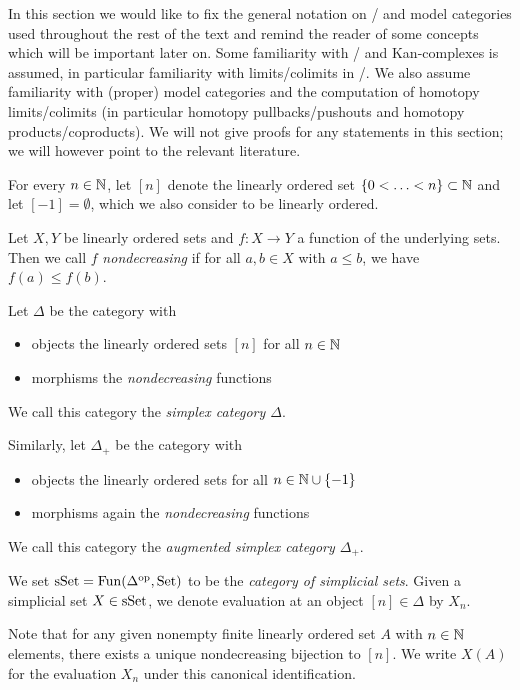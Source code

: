 In this section we would like to fix the general notation on \inftycats/ and model categories used throughout the rest of the text and remind the reader of some concepts which will be important later on.
Some familiarity with \inftycats/ and Kan-complexes is assumed, in particular familiarity with limits/colimits in \inftycats/.
We also assume familiarity with (proper) model categories and the computation of homotopy limits/colimits (in particular homotopy pullbacks/pushouts and homotopy products/coproducts).
We will not give proofs for any statements in this section; we will however point to the relevant literature.
\begin{definition}
    For every $n\in\mathbb{N}$, let $[n]$ denote the linearly ordered set $\left\lbrace0<\ldots<n\right\rbrace\subset\mathbb{N}$ and let $[-1]=\emptyset$, which we also consider to be linearly ordered.
\end{definition}
\begin{definition}
    Let $X,Y$ be linearly ordered sets and $f\colon X\to Y$ a function of the underlying sets.
    Then we call $f$ \emph{nondecreasing} if for all $a,b\in X$ with $a\leq b$, we have $f(a)\leq f(b)$.
\end{definition}
\begin{definition}
    Let $\Delta$ be the category with
    \begin{itemize}
        \item objects the linearly ordered sets $[n]$ for all $n\in\mathbb{N}$
        \item morphisms the \emph{nondecreasing} functions
    \end{itemize}
    We call this category the \emph{simplex category $\Delta$}.

    Similarly, let $\Delta_+$ be the category with
    \begin{itemize}
        \item objects the linearly ordered sets for all $n\in\mathbb{N}\cup\left\lbrace-1\right\rbrace$ 
        \item morphisms again the \emph{nondecreasing} functions
    \end{itemize}
    We call this category the \emph{augmented simplex category $\Delta_+$}.
\end{definition}
\begin{definition}
    We set $\operatorname{sSet}=\operatorname{Fun}(\Delta^{\operatorname{op}},\operatorname{Set})$ to be the \emph{category of simplicial sets}.
    Given a simplicial set $X\in\operatorname{sSet}$, we denote evaluation at an object $[n]\in\Delta$ by $X_n$.

    Note that for any given nonempty finite linearly ordered set $A$ with $n\in\mathbb{N}$ elements, there exists a unique nondecreasing bijection to $[n]$.
    We write $X(A)$ for the evaluation $X_n$ under this canonical identification. 
\end{definition}
